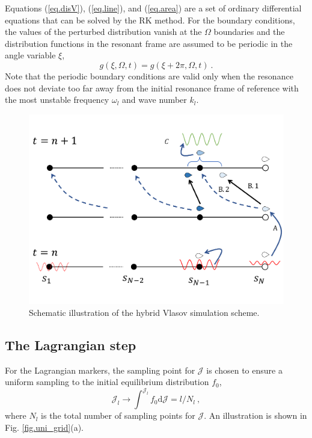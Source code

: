 Equations (\ref{eq.disV}), (\ref{eq.line}), and (\ref{eq.area})
are a set of ordinary differential equations that can be solved  by the RK method.
For the boundary conditions, the values of the perturbed distribution vanish at the $\Omega$ boundaries
and
the distribution functions in  the resonant frame are assumed to be periodic in the  angle variable $\xi$,
\begin{equation}
    g\left(\xi,\Omega,t\right)=g\left(\xi+2 \pi,\Omega,t\right)~.
\end{equation}
Note that the periodic boundary conditions are valid only when the resonance does not deviate too far away from the initial resonance frame of reference with the most unstable frequency $\omega_l$ and wave number $k_l$.
\begin{figure}[htbp]
    \centering
    \includegraphics[scale=0.5]{cpc_img/Hybrid_demo.pdf}
    \caption{Schematic illustration of the hybrid Vlasov simulation scheme.}
    \label{fig.demo}
\end{figure}

\subsection{The Lagrangian step}
For the Lagrangian markers,
the sampling point for $\mathcal{J}$ is chosen to ensure  a uniform sampling to the initial equilibrium distribution $f_0$,
\begin{equation} 
    \mathcal{J}_l \to \int^{\mathcal{J}_l} f_0 \mathrm{d}\mathcal{J} = l/N_l~, 
\end{equation}
where $N_l$ is the total number of sampling points for $\mathcal{J}$. An illustration is shown in Fig. \ref{fig.uni_grid}(a).

